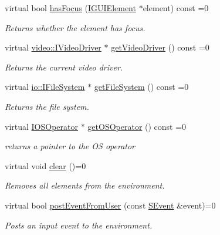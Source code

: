 \begin{DoxyCompactItemize}
virtual bool \hyperlink{classirr_1_1gui_1_1IGUIEnvironment_a88c483f30a0f35debed70e8e51836552}{has\+Focus} (\hyperlink{classirr_1_1gui_1_1IGUIElement}{I\+G\+U\+I\+Element} $\ast$element) const =0
\begin{DoxyCompactList}\small\item\em Returns whether the element has focus. \end{DoxyCompactList}\item 
virtual \hyperlink{classirr_1_1video_1_1IVideoDriver}{video\+::\+I\+Video\+Driver} $\ast$ \hyperlink{classirr_1_1gui_1_1IGUIEnvironment_a48f5e442f0a2074a531234ab83148fe2}{get\+Video\+Driver} () const =0
\begin{DoxyCompactList}\small\item\em Returns the current video driver. \end{DoxyCompactList}\item 
virtual \hyperlink{classirr_1_1io_1_1IFileSystem}{io\+::\+I\+File\+System} $\ast$ \hyperlink{classirr_1_1gui_1_1IGUIEnvironment_ad3ae4570702000e09cacdb663f0ec363}{get\+File\+System} () const =0
\begin{DoxyCompactList}\small\item\em Returns the file system. \end{DoxyCompactList}\item 
virtual \hyperlink{classirr_1_1IOSOperator}{I\+O\+S\+Operator} $\ast$ \hyperlink{classirr_1_1gui_1_1IGUIEnvironment_afc715b9a9d98ae3aa8e769c9fb2f4f31}{get\+O\+S\+Operator} () const =0
\begin{DoxyCompactList}\small\item\em returns a pointer to the OS operator \end{DoxyCompactList}\item 
\mbox{\label{classirr_1_1gui_1_1IGUIEnvironment_a77b0cdd0aec36dbb9c558446fab383c2}} 
virtual void \hyperlink{classirr_1_1gui_1_1IGUIEnvironment_a77b0cdd0aec36dbb9c558446fab383c2}{clear} ()=0
\begin{DoxyCompactList}\small\item\em Removes all elements from the environment. \end{DoxyCompactList}\item 
virtual bool \hyperlink{classirr_1_1gui_1_1IGUIEnvironment_aff1cc1109841f9bccd19634870c7cd65}{post\+Event\+From\+User} (const \hyperlink{structirr_1_1SEvent}{S\+Event} \&event)=0
\begin{DoxyCompactList}\small\item\em Posts an input event to the environment. \end{DoxyCompactList}\item 

\end{DoxyCompactItemize}
